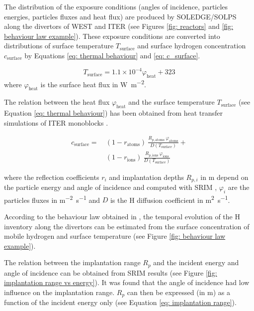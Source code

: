 The distribution of the exposure conditions (angles of incidence, particles energies, particles fluxes and heat flux) are produced by SOLEDGE/SOLPS along the divertors of WEST and ITER (see Figures \ref{fig: reactors} and \ref{fig: behaviour law example}).
These exposure conditions are converted into distributions of surface temperature $T_\mathrm{surface}$ and surface hydrogen concentration $c_\mathrm{surface}$ by Equations \eqref{eq: thermal behaviour} and \eqref{eq: c_surface}.

\begin{equation}
    T_\mathrm{surface} = 1.1\times 10^{-4} \varphi_\mathrm{heat} + 323
    \label{eq: thermal behaviour}
\end{equation}
where $\varphi_\mathrm{heat}$ is the surface heat flux in \si{W.m^{-2}}.

The relation between the heat flux $\varphi_\mathrm{heat}$ and the surface temperature $T_\mathrm{surface}$ (see Equation \eqref{eq: thermal behaviour}) has been obtained from heat transfer simulations of ITER monoblocks .

\begin{align}
    \label{eq: c_surface}
    c_\mathrm{surface} = \ &(1 - r_\mathrm{atoms}) \ \frac{R_{p, \mathrm{atoms}} \ \varphi_\mathrm{atoms}}{D(T_\mathrm{surface})} + \\ &(1 - r_\mathrm{ions}) \nonumber \ \frac{R_{p, \mathrm{ions}} \ \varphi_\mathrm{ions}}{D(T_\mathrm{surface})}
\end{align}

where the reflection coefficients $r_i$ and implantation depths $R_{p, i}$ in \si{m} depend on the particle energy and angle of incidence and computed with SRIM , $\varphi_{i}$ are the particles fluxes in \si{m^{-2}.s^{-1}} and $D$ is the H diffusion coefficient in \si{m^{2}.s^{-1}}.


According to the behaviour law obtained in , the temporal evolution of the H inventory along the divertors can be estimated from the surface concentration of mobile hydrogen and surface temperature (see Figure \ref{fig: behaviour law example}).



The relation between the implantation range $R_p$ and the incident energy and angle of incidence can be obtained from SRIM  results (see Figure \ref{fig: implantation range vs energy}).
It was found that the angle of incidence had low influence on the implantation range.
$R_p$ can then be expressed (in \si{m}) as a function of the incident energy only (see Equation \eqref{eq: implantation range}).

